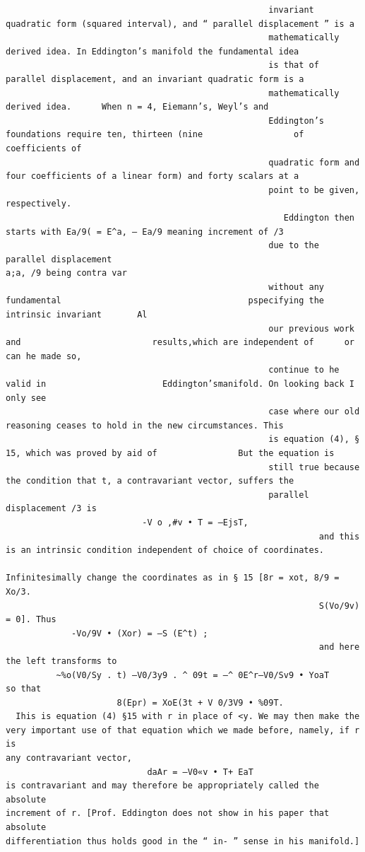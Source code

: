\documentclass[10pt]{article}
\begin{document}
\begin{verbatim}
                                                    invariant quadratic form (squared interval), and “ parallel displacement ” is a
                                                    mathematically derived idea. In Eddington’s manifold the fundamental idea
                                                    is that of parallel displacement, and an invariant quadratic form is a
                                                    mathematically derived idea.      When n = 4, Eiemann’s, Weyl’s and
                                                    Eddington’s foundations require ten, thirteen (nine                  of coefficients of
                                                    quadratic form and four coefficients of a linear form) and forty scalars at a
                                                    point to be given, respectively.
                                                       Eddington then starts with Ea/9( = E^a, — Ea/9 meaning increment of /3
                                                    due to the parallel displacement                                                a;a, /9 being contra var
                                                    without any fundamental                                     pspecifying the intrinsic invariant       Al
                                                    our previous work and                          results,which are independent of      or can he made so,
                                                    continue to he valid in                       Eddington’smanifold. On looking back I only see
                                                    case where our old reasoning ceases to hold in the new circumstances. This
                                                    is equation (4), § 15, which was proved by aid of                But the equation is
                                                    still true because the condition that t, a contravariant vector, suffers the
                                                    parallel displacement /3 is
                           -V o ,#v • T = —EjsT,
                                                              and this is an intrinsic condition independent of choice of coordinates.
                                                              Infinitesimally change the coordinates as in § 15 [8r = xot, 8/9 = Xo/3.
                                                              S(Vo/9v) = 0]. Thus
             -Vo/9V • (Xor) = —S (E^t) ;
                                                              and here the left transforms to
          ~%o(V0/Sy . t) —V0/3y9 . ^ 09t = —^ 0E^r—V0/Sv9 • YoaT
so that
                      8(Epr) = XoE(3t + V 0/3V9 • %09T.
  Ihis is equation (4) §15 with r in place of <y. We may then make the
very important use of that equation which we made before, namely, if r is
any contravariant vector,
                            daAr = —V0«v • T+ EaT
is contravariant and may therefore be appropriately called the absolute
increment of r. [Prof. Eddington does not show in his paper that absolute
differentiation thus holds good in the “ in- ” sense in his manifold.]


\end{verbatim}
\end{document}
